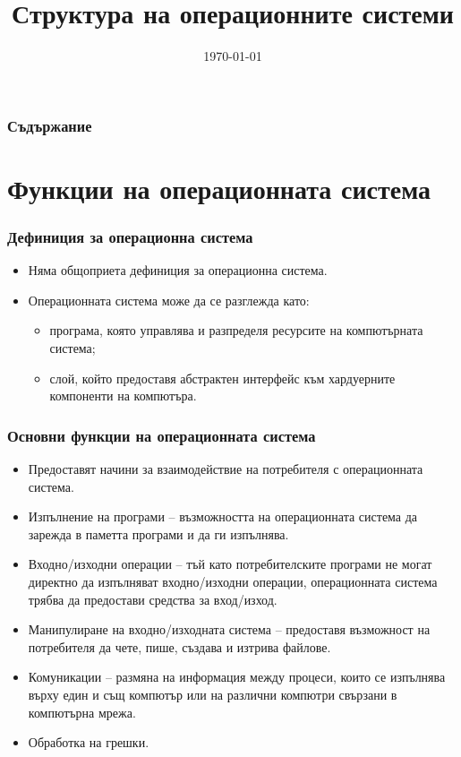 \documentclass[ignorenonframetext, hyperref=unicode]{beamer}
\title[Структура на ОС]{Структура на операционните системи} \lubo
\date{\today}
\begin{document}
\frame{\maketitle}

\begin{frame}
\frametitle{Съдържание}
\tableofcontents %
\end{frame}


\section{Функции на операционната система}

\begin{frame}
\frametitle{Дефиниция за операционна система}
\begin{itemize}
\item Няма общоприета дефиниция за операционна система.
\item Операционната система може да се разглежда като:
\begin{itemize}
\item програма, която управлява и разпределя ресурсите на компютърната
система;
\item слой, който предоставя абстрактен интерфейс към хардуерните компоненти на
компютъра.
\end{itemize}
\end{itemize}
\end{frame}


\begin{frame}
\frametitle{Основни функции на операционната система}
\begin{itemize}
\item Предоставят начини за взаимодействие на потребителя с операционната
система.
\item Изпълнение на програми -- възможността на операционната система да зарежда
в паметта програми и да ги изпълнява.
\item Входно/изходни операции -- тъй като потребителските програми не могат
директно да изпълняват входно/изходни операции, операционната система трябва да
предостави средства за вход/изход.
\item Манипулиране на входно/изходната система -- предоставя възможност на
потребителя да чете, пише, създава и изтрива файлове.
\item Комуникации -- размяна на информация между процеси, които се изпълнява
върху един и същ компютър или на различни компютри свързани в компютърна мрежа.
\item Обработка на грешки.

\end{itemize}
\end{frame}
\end{document}
